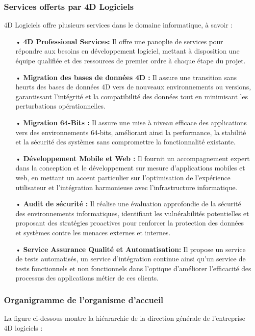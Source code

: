 \subsubsection{Services offerts par 4D Logiciels}
4D Logiciels offre plusieurs services dans le domaine informatique, à savoir :
\begin{spacing}{1.1}
    
\begin{itemize}
    \item[ • ] \textbf{4D Professional Services: } Il offre une panoplie de services pour répondre aux besoins en développement logiciel, mettant à disposition une équipe qualifiée et des ressources de premier ordre à chaque étape du projet.
    \item[ • ] \textbf{Migration des bases de données 4D :} Il assure une transition sans heurts des bases de données 4D vers de nouveaux environnements ou versions, garantissant l’intégrité et la compatibilité des données tout en minimisant les perturbations opérationnelles.
    \item[ • ] \textbf{Migration 64-Bits : } Il assure une mise à niveau efficace des applications vers des environnements 64-bits, améliorant ainsi la performance, la stabilité et la sécurité des systèmes sans compromettre la fonctionnalité existante.
    \item[ • ] \textbf{Développement Mobile et Web :} Il fournit un accompagnement expert dans la conception et le développement sur mesure d’applications mobiles et web, en mettant un accent particulier sur l’optimisation de l’expérience utilisateur et l’intégration harmonieuse avec l’infrastructure informatique.
    \item[ • ] \textbf{Audit de sécurité :} Il réalise une évaluation approfondie de la sécurité des environnements informatiques, identifiant les vulnérabilités potentielles et proposant des stratégies proactives pour renforcer la protection des données et systèmes contre les menaces externes et internes.
    \item[ • ] \textbf{Service Assurance Qualité et Automatisation:} Il propose un service de tests automatisés, un service d’intégration continue ainsi qu’un service de tests fonctionnels et non fonctionnels dans l’optique d’améliorer l’efficacité des processus des applications métier de ces clients.
\end{itemize}
\end{spacing}


\subsubsection{Organigramme de l’organisme d’accueil}
La figure ci-dessous montre la hiéararchie de la direction générale de l’entreprise 4D
logiciels :


